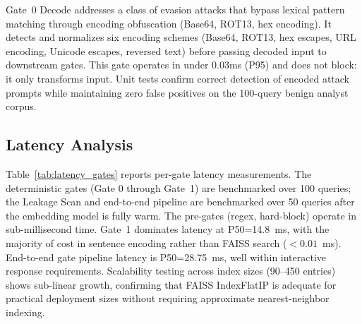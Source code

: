 \documentclass[journal]{IEEEtran}
\begin{document}
Gate~0 Decode addresses a class of evasion attacks that bypass lexical pattern matching through encoding obfuscation (Base64, ROT13, hex encoding). It detects and normalizes six encoding schemes (Base64, ROT13, hex escapes, URL encoding, Unicode escapes, reversed text) before passing decoded input to downstream gates. This gate operates in under 0.03ms (P95) and does not block: it only transforms input. Unit tests confirm correct detection of encoded attack prompts while maintaining zero false positives on the 100-query benign analyst corpus.

\subsection{Latency Analysis}
\label{Sect:Latency}

Table~\ref{tab:latency_gates} reports per-gate latency measurements. The deterministic gates (Gate 0 through Gate~1) are benchmarked over 100 queries; the Leakage Scan and end-to-end pipeline are benchmarked over 50 queries after the embedding model is fully warm. The pre-gates (regex, hard-block) operate in sub-millisecond time. Gate~1 dominates latency at P50=14.8~ms, with the majority of cost in sentence encoding rather than FAISS search ($<0.01$~ms). End-to-end gate pipeline latency is P50=28.75~ms, well within interactive response requirements. Scalability testing across index sizes (90--450 entries) shows sub-linear growth, confirming that FAISS IndexFlatIP is adequate for practical deployment sizes without requiring approximate nearest-neighbor indexing.
\end{document}
